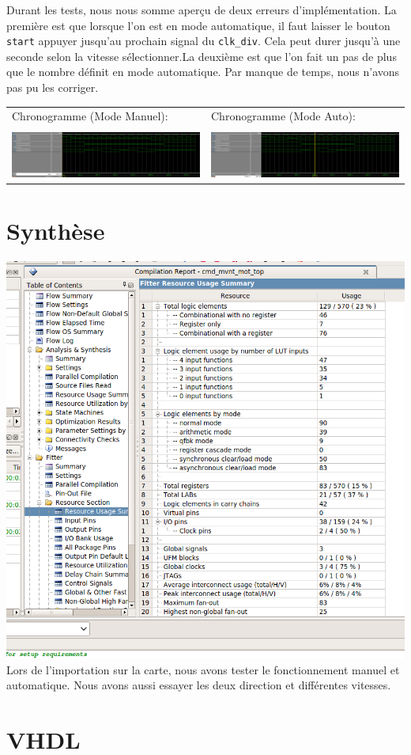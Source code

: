 \documentclass[10pt,a4paper]{article}
\begin{document}
Durant les tests, nous nous somme aperçu de deux erreurs d'implémentation. La première est que lorsque l'on est en mode automatique, il faut laisser le bouton \texttt{start} appuyer jusqu'au prochain signal du \texttt{clk\_div}. Cela peut durer jusqu'à une seconde selon la vitesse sélectionner.La deuxième est que l'on fait un pas de plus que le nombre définit en mode automatique. Par manque de temps, nous n'avons pas pu les corriger.

\begin{tabular}{ll}

Chronogramme (Mode Manuel): & Chronogramme (Mode Auto):\\\\
\includegraphics[angle=90,scale=0.45]{images/manualSim.jpg} & \includegraphics[angle=90,scale=0.45]{images/autoSim.jpg}\\

\end{tabular}
\newpage
\section{Synthèse}
\includegraphics[scale=0.45]{images/summaryQuartus.png}\\

Lors de l'importation sur la carte, nous avons tester le fonctionnement manuel et automatique. Nous avons aussi essayer les deux direction et différentes vitesses.

\newpage
\section{VHDL}
\end{document}
